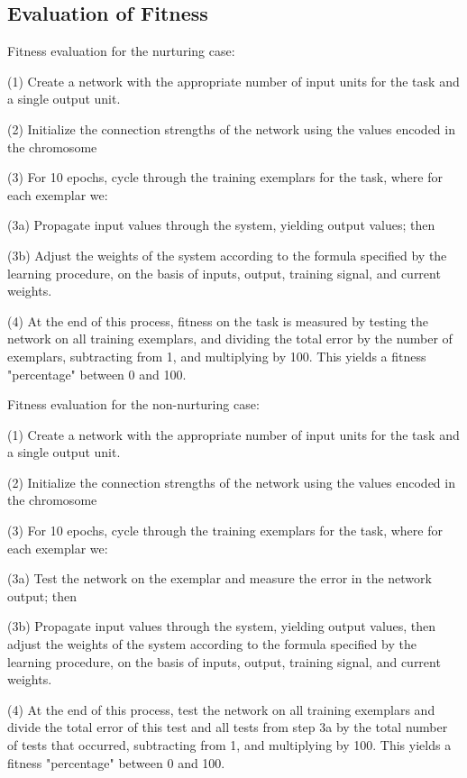 \documentclass[master]{outhesis}
\begin{document}
\subsection{Evaluation of Fitness}

Fitness evaluation for the nurturing case:

(1) Create a network with the appropriate number of input units for the task and a single output unit.

(2) Initialize the connection strengths of the network using the values encoded in the chromosome

(3) For 10 epochs, cycle through the training exemplars for the task, where for each exemplar we:

(3a) Propagate input values through the system, yielding output values; then

(3b) Adjust the weights of the system according to the formula specified by the learning procedure, on the basis of inputs, output, training signal, and current weights.

(4) At the end of this process, fitness on the task is measured by testing the network on all training exemplars, and dividing the total error by the number of exemplars, subtracting from 1, and multiplying by 100. This yields a fitness "percentage" between 0 and 100.

Fitness evaluation for the non-nurturing case:

(1) Create a network with the appropriate number of input units for the task and a single output unit.

(2) Initialize the connection strengths of the network using the values encoded in the chromosome

(3) For 10 epochs, cycle through the training exemplars for the task, where for each exemplar we:

(3a) Test the network on the exemplar and measure the error in the network output; then

(3b) Propagate input values through the system, yielding output values, then adjust the weights of the system according to the formula specified by the learning procedure, on the basis of inputs, output, training signal, and current weights.

(4) At the end of this process, test the network on all training exemplars and divide the total error of this test and all tests from step 3a by the total number of tests that occurred, subtracting from 1, and multiplying by 100. This yields a fitness "percentage" between 0 and 100.
\end{document}
